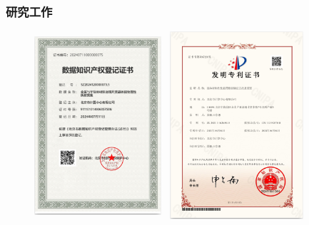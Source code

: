 \frame
{
	\frametitle{研究工作}
\begin{figure}[h!]
\vspace*{-0.05in}
\centering
\includegraphics[height=2.75in,width=1.85in,viewport=0 0 579 810,clip]{Figures/Registration_Certificate.png}
\includegraphics[height=2.75in,width=2.10in,viewport=0 0 609 799,clip]{Figures/Certificate-of-Patent.png}
\label{Certification}
\end{figure}
}
%
